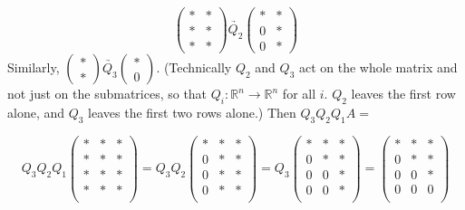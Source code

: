 \begin{equation*}
\begin{pmatrix}
\ast & \ast \\
\ast & \ast \\
\ast & \ast 
\end{pmatrix}
\underrightarrow{Q_2}
\begin{pmatrix}
\ast & \ast \\
0 & \ast \\
0 & \ast 
\end{pmatrix}
\end{equation*}
Similarly, $ \begin{pmatrix} \ast \\ \ast \end{pmatrix} \underrightarrow{Q_3} \begin{pmatrix} \ast \\ 0 \end{pmatrix} $. (Technically $Q_2$ and $Q_3$ act on the whole matrix and not just on the submatrices, so that $Q_i: \mathbb{R}^n \rightarrow \mathbb{R}^n$ for all $i$. $Q_2$ leaves the first row alone, and $Q_3$ leaves the first two rows alone.) Then $Q_3 Q_2 Q_1 A =$ 

\begin{equation*}
Q_3 Q_2 Q_1
\begin{pmatrix}
\ast & \ast & \ast \\
\ast & \ast & \ast \\
\ast & \ast & \ast \\
\ast & \ast & \ast \\
\end{pmatrix}
= Q_3 Q_2
\begin{pmatrix}
\ast & \ast & \ast \\
0 & \ast & \ast \\
0 & \ast & \ast \\
0 & \ast & \ast \\
\end{pmatrix}
= Q_3
\begin{pmatrix}
\ast & \ast & \ast \\
0 & \ast & \ast \\
0 & 0 & \ast \\
0 & 0 & \ast \\
\end{pmatrix}
= 
\begin{pmatrix}
\ast & \ast & \ast \\
0 & \ast & \ast \\
0 & 0 & \ast \\
0 & 0 & 0 \\
\end{pmatrix}
\end{equation*}

